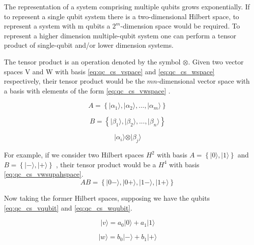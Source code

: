 The representation of a system comprising multiple qubits grows exponentially. If to represent a single qubit system there is a two-dimensional Hilbert space, to represent a system with m qubits a $2^m$-dimension space would be required. 
To represent a higher dimension multiple-qubit system one can perform a tensor product of single-qubit and/or lower dimension systems.

The tensor product is an operation denoted by the symbol $\otimes$. 
Given two vector spaces V and W with basis 
\ref{eq:qc_cs_vspace} and \ref{eq:qc_cs_wspace}
respectively, their tensor product would be the $mn$-dimensional vector space with a basis with elements of the form \ref{eq:qc_cs_vwspace} \cite{Rieffel2011}.


\begin{equation}
\label{eq:qc_cs_vspace}
A = \left\{ \vert \alpha_{1} \rangle, \vert \alpha_{2} \rangle , ..., \vert \alpha_{m} \rangle \right\}
\end{equation} 

\begin{equation} 
\label{eq:qc_cs_wspace}
B = \left\{ \vert \beta_{1} \rangle, \vert \beta_{2} \rangle , ..., \vert \beta_{n} \rangle \right\}
\end{equation} 

\begin{equation} 
\label{eq:qc_cs_vwspace} 
\vert \alpha_{i} \rangle \otimes \vert \beta_{j} \rangle
\end{equation}


For example, if we consider two Hilbert spaces $H^2$ with basis
$ A=\left\{ \vert 0 \rangle , \vert 1 \rangle \right\}$ and 
$B =\left\{ \vert - \rangle, \vert + \rangle \right\}$
, their tensor product would be a $H^4$ with basis \ref{eq:qc_cs_vwsupahspace}.
\begin{equation}
\label{eq:qc_cs_vwsupahspace}
AB = \left\{ \vert 0  - \rangle, \vert 0 + \rangle, \vert 1 - \rangle,  \vert 1 + \rangle \right\}
\end{equation}

Now taking the former Hilbert spaces, supposing we have the qubits \ref{eq:qc_cs_vqubit} and \ref{eq:qc_cs_wqubit}.

\begin{equation}
\label{eq:qc_cs_vqubit}
\vert v \rangle = a_{0}\vert 0\rangle + a_{1}\vert 1 \rangle
\end{equation}

\begin{equation}
\label{eq:qc_cs_wqubit}
\vert w \rangle = b_{0}\vert -\rangle + b_{1}\vert + \rangle
\end{equation}

